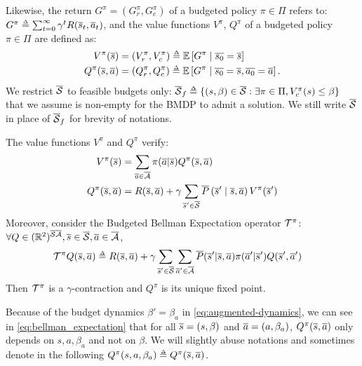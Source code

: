 Likewise, the return $G^\pi = (G_r^\pi, G_c^\pi)$ of a budgeted policy $\pi\in\Pi$ refers to:
$G^\pi \eqdef \sum_{t=0}^\infty \gamma^t R(\os_t, \oa_t)$,
and the value functions $V^\pi$, $Q^\pi$ of a budgeted policy $\pi\in\Pi$ are defined as:
\begin{align}
\label{eq:value-function}
V^\pi(\os) &= (V_r^\pi, V_c^\pi) \eqdef \expectedvalue\left[ G^\pi \condbar \ov{s_0} = \os\right]\\ Q^\pi(\os, \oa)&= (Q_r^\pi, Q_c^\pi) \eqdef \expectedvalue\left[ G^\pi \condbar \ov{s_0} = \os, \ov{a_0} = \oa\right].
\end{align}
We restrict $\overline{\mathcal{S}}$ to feasible budgets only: $\ocS_f \eqdef \{(s,\beta)\in\ocS: \exists \pi\in\Pi, V_c^\pi(s) \leq \beta\}$ that we assume is non-empty for the BMDP to admit a solution. We still write $\overline{\mathcal{S}}$ in place of $\overline{\mathcal{S}}_f$ for brevity of notations.

\begin{proposition}
	\begin{leftbar}[propositionbar]
	\label{prop:bellman-expectation}
	The value functions $V^\pi$ and $ Q^\pi$ verify:
	\begin{align}
	V^\pi(\overline{s}) &= \sum_{\overline{a}\in\overline{\mathcal{A}}}\pi(\overline{a} | \overline{s}) Q^\pi(\overline{s}, \overline{a}) \\ Q^\pi(\overline{s}, \overline{a}) &= R(\overline{s}, \overline{a}) + \gamma\sum_{\overline{s}'\in\overline{\mathcal{S}}}\overline{P}\left(\overline{s}' \;\middle|\; \overline{s}, \overline{a}\right) V^\pi(\overline{s}') \label{eq:bellman_expectation}
	\end{align}
	Moreover, consider the Budgeted Bellman Expectation operator $\mathcal{T}^\pi$:
	$\forall Q\in(\mathbb{R}^2)^{\overline{\mathcal{S}}\overline{\mathcal{A}}}, \overline{s}\in\overline{\mathcal{S}}, \overline{a}\in\overline{\mathcal{A}}$,
	\begin{align}
	\label{eq:bellman_expectation_operator}
	\cT^\pi Q(\os, \oa) &\eqdef R(\os, \oa) + \gamma \sum_{\os'\in\ocS}\sum_{\oa'\in\ocA}\ov{P}(\os'|\os, \oa)\pi(\oa'|\os') Q(\os', \oa')
	\end{align}
	Then $\mathcal{T}^\pi$ is a $\gamma$-contraction and $Q^\pi$ is its unique fixed point.
	\end{leftbar}
\end{proposition}

\begin{remark}
	\begin{leftbar}[remarkbar]
	Because of the budget dynamics $\beta' = \beta_a$ in \eqref{eq:augmented-dynamics}, we can see in \eqref{eq:bellman_expectation} that for all $\overline{s}=(s, \beta)$ and $\overline{a}=(a, \beta_a)$, $Q^\pi(\overline{s}, \overline{a})$ only depends on $s, a, \beta_a$ and not on $\beta$. We will slightly abuse notations and sometimes denote in the following $Q^\pi(s, a, \beta_a) \eqdef Q^\pi(\os, \oa)$.
	\end{leftbar}
\end{remark}

